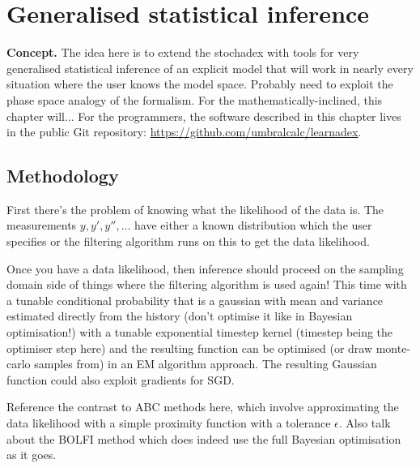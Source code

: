 \chapter{\sffamily Generalised statistical inference}

{\bfseries\sffamily Concept.} The idea here is to extend the stochadex with tools for very generalised statistical inference of an explicit model that will work in nearly every situation where the user knows the model space. Probably need to exploit the phase space analogy of the formalism. For the mathematically-inclined, this chapter will... For the programmers, the software described in this chapter lives in the public Git repository: \href{https://github.com/umbralcalc/learnadex}{https://github.com/umbralcalc/learnadex}.


\section{\sffamily Methodology}

First there's the problem of knowing what the likelihood of the data is. The measurements $y, y', y'', \dots$ have either a known distribution which the user specifies or the filtering algorithm runs on this to get the data likelihood.

Once you have a data likelihood, then inference should proceed on the sampling domain side of things where the filtering algorithm is used again! This time with a tunable conditional probability that is a gaussian with mean and variance estimated directly from the history (don't optimise it like in Bayesian optimisation!) with a tunable exponential timestep kernel (timestep being the optimiser step here) and the resulting function can be optimised (or draw monte-carlo samples from) in an EM algorithm approach. The resulting Gaussian function could also exploit gradients for SGD.

Reference the contrast to ABC methods here, which involve approximating the data likelihood with a simple proximity function with a tolerance $\epsilon$. Also talk about the BOLFI method which does indeed use the full Bayesian optimisation as it goes.

